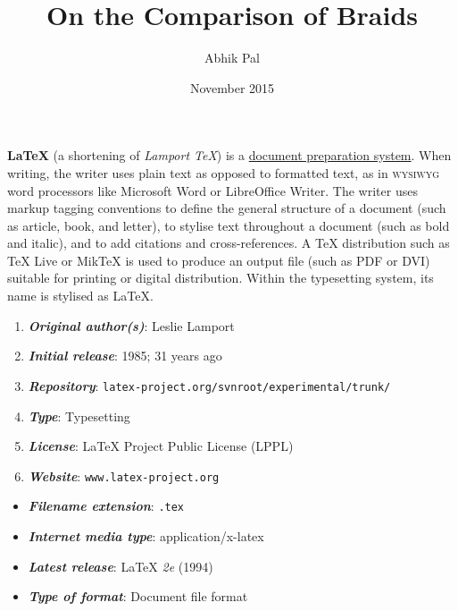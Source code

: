 \documentclass{article}
\title{On the Comparison of Braids}
\author{Abhik Pal}
\date{November 2015}
\begin{document}
\maketitle

\textbf{LaTeX} (a shortening of \emph{Lamport TeX}) is a \underline{document preparation system}. When writing, the writer uses plain text as opposed to formatted text, as in \textsc{wysiwyg} word
processors like Microsoft Word or LibreOffice Writer. The writer uses markup tagging conventions
to define the general structure of a document (such as article, book, and letter), to stylise text
throughout a document (such as bold and italic), and to add citations and cross-references. A TeX
distribution such as TeX Live or MikTeX is used to produce an output file (such as PDF or DVI)
suitable for printing or digital distribution. Within the typesetting system, its name is stylised
as \LaTeX.

\begin{enumerate}
    \item \textbf{\emph{Original author(s)}}: Leslie Lamport
    \item \textbf{\emph{Initial release}}: 1985; 31 years ago
    \item \textbf{\emph{Repository}}: \texttt{latex-project.org/svnroot/experimental/trunk/}
    \item \textbf{\emph{Type}}: Typesetting
    \item \textbf{\emph{License}}: LaTeX Project Public License (LPPL)
    \item \textbf{\emph{Website}}: \texttt{www.latex-project.org}
\end{enumerate}

\begin{itemize}
    \item \textbf{\emph{Filename extension}}: \texttt{.tex}
    \item \textbf{\emph{Internet media type}}: application/x-latex
    \item \textbf{\emph{Latest release}}: LaTeX \emph{2e} (1994)
    \item \textbf{\emph{Type of format}}: Document file format
\end{itemize}
\end{document}
